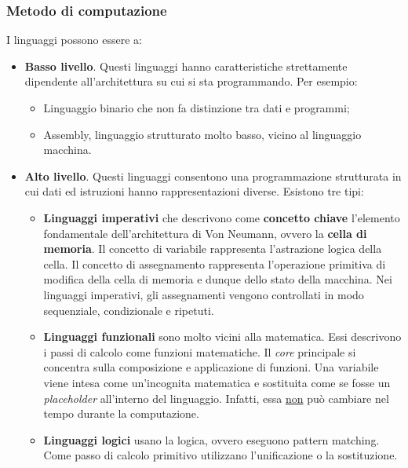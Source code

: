 \documentclass[a4paper]{article}
\begin{document}
	\subsubsection{Metodo di computazione}
	
	I linguaggi possono essere a:
	\begin{itemize}
		\item \textcolor{Red3}{\textbf{Basso livello}}. Questi linguaggi hanno caratteristiche strettamente dipendente all'architettura su cui si sta programmando. Per esempio:
		\begin{itemize}
			\item Linguaggio binario che non fa distinzione tra dati e programmi;

			\item Assembly, linguaggio strutturato molto basso, vicino al linguaggio macchina.
		\end{itemize}
	
		\item \textcolor{Red3}{\textbf{Alto livello}}. Questi linguaggi consentono una programmazione strutturata in cui dati ed istruzioni hanno rappresentazioni diverse. Esistono tre tipi:
		\begin{itemize}
			\item \textcolor{Red3}{\textbf{Linguaggi imperativi}} che descrivono come \textbf{concetto chiave} l'elemento fondamentale dell'architettura di Von Neumann, ovvero la \textbf{cella di memoria}.\newline
			Il concetto di variabile rappresenta l'astrazione logica della cella.\newline
			Il concetto di assegnamento rappresenta l'operazione primitiva di modifica della cella di memoria e dunque dello stato della macchina.\newline
			Nei linguaggi imperativi, gli assegnamenti vengono controllati in modo sequenziale, condizionale e ripetuti.
			
			\item \textcolor{Red3}{\textbf{Linguaggi funzionali}} sono molto vicini alla matematica. Essi descrivono i passi di calcolo come funzioni matematiche. Il \emph{core} principale si concentra sulla composizione e applicazione di funzioni.\newline
			Una variabile viene intesa come un'incognita matematica e sostituita come se fosse un \emph{placeholder} all'interno del linguaggio. Infatti, essa \underline{non} può cambiare nel tempo durante la computazione.
			
			\item \textcolor{Red3}{\textbf{Linguaggi logici}} usano la logica, ovvero eseguono pattern matching. Come passo di calcolo primitivo utilizzano l'unificazione o la sostituzione.
		\end{itemize}
	\end{itemize}
\end{document}
